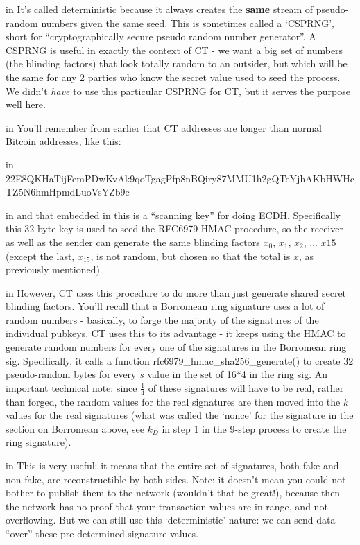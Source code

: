 \documentclass[10pt,a4paper]{article}
\begin{document}
 in \noindent It's called deterministic because it always creates the \textbf{same} stream of pseudo-random numbers given the same seed. This is sometimes called a `CSPRNG', short for ``cryptographically secure pseudo random number generator''. A CSPRNG is useful in exactly the context of CT - we want a big set of numbers (the blinding factors) that look totally random to an outsider, but which will be the same for any 2 parties who know the secret value used to seed the process. We didn't \emph{have} to use this particular CSPRNG for CT, but it serves the purpose well here.

 in \noindent You'll remember from earlier that CT addresses are longer than normal Bitcoin addresses, like this:

 in \noindent 22E8QKHaTijFemPDwKvAk9qoTgagPfp8nBQiry87MMU1h2gQTeYjhAKbHWHcTZ5N6hmHpmdLuoVsYZb9e

 in \noindent and that embedded in this is a ``scanning key'' for doing ECDH. Specifically this 32 byte key is used to seed the RFC6979 HMAC procedure, so the receiver as well as the sender can generate the same blinding factors $x_{0}$, $x_{1}$, $x_{2}$, ... $x{15}$ (except the last, $x_{15}$, is not random, but chosen so that the total is $x$, as previously mentioned).

 in \noindent However, CT uses this procedure to do more than just generate shared secret blinding factors. You'll recall that a Borromean ring signature uses a lot of random numbers - basically, to forge the majority of the signatures of the individual pubkeys. CT uses this to its advantage - it keeps using the HMAC to generate random numbers for every one of the signatures in the Borromean ring sig. Specifically, it calls a function rfc6979\_hmac\_sha256\_generate() to create 32 pseudo-random bytes for every $s$ value in the set of 16*4 in the ring sig. An important technical note: since $\frac{1}{4}$ of these signatures will have to be real, rather than forged, the random values for the real signatures are then moved into the $k$ values for the real signatures (what was called the `nonce' for the signature in the section on Borromean above, see $k_D$ in step 1 in the 9-step process to create the ring signature).

 in \noindent This is very useful: it means that the entire set of signatures, both fake and non-fake, are reconstructible by both sides. Note: it doesn't mean you could not bother to publish them to the network (wouldn't that be great!), because then the network has no proof that your transaction values are in range, and not overflowing. But we can still use this `deterministic' nature: we can send data ``over'' these pre-determined signature values.
\end{document}

